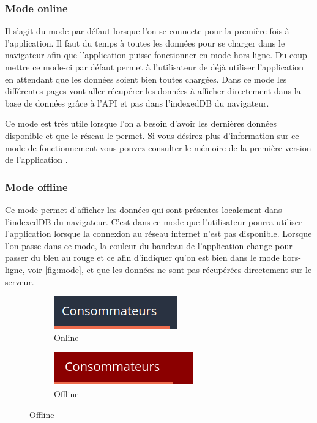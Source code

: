 \documentclass{EPL-master-thesis-covers-FR}
\begin{document}
			\subsubsection*{Mode online}
				Il s'agit du mode par défaut lorsque l'on se connecte pour la première fois à l'application. Il faut du temps à toutes les données pour se charger dans le navigateur afin que l'application puisse fonctionner en mode hors-ligne. Du coup mettre ce mode-ci par défaut permet à  l'utilisateur de déjà utiliser l'application en attendant que les données soient bien toutes chargées. Dans ce mode les différentes pages vont aller récupérer les données à afficher directement dans la base de données grâce à l'API et pas dans l'indexedDB du navigateur. 
				
				Ce mode est très utile lorsque l'on a besoin d'avoir les dernières données disponible et que le réseau le permet. Si vous désirez plus d'information sur ce mode de fonctionnement vous pouvez consulter le mémoire de la première version de l'application \cite{ref:haitiwater}.
			
			\subsubsection*{Mode offline}
			
				Ce mode permet d'afficher les données qui sont présentes localement dans l'indexedDB du navigateur. C'est dans ce mode que l'utilisateur pourra utiliser l'application lorsque la connexion au réseau internet n'est pas disponible. Lorsque l'on passe dans ce mode, la couleur du bandeau de l'application change pour passer du bleu au rouge et ce afin d'indiquer qu'on est bien dans le mode hors-ligne, voir \ref{fig:mode}, et que les données ne sont pas récupérées directement sur le serveur.
								
				\begin{figure}[H]
					\caption{Mode}
					\label{fig:mode}
					\centering
					\begin{subfigure}[b]{0.3\textwidth}
  						\includegraphics[width=1\linewidth]{images/consumer_blue}
  						\caption{Online}
					\end{subfigure}%
					\begin{subfigure}[b]{0.333\textwidth}
  						\includegraphics[width=1\linewidth]{images/consumer_red}
  						\caption{Offline}
					\end{subfigure}
					\label{fig:test}
				\end{figure}
			
\end{document}
